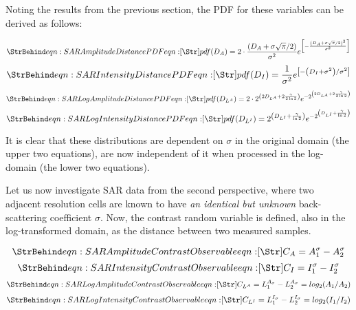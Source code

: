 Noting the results from the previous section, the PDF for these variables can be derived as follows:

\begin{equation}
  \label{eqn:SAR Amplitude Distance PDF}
  \caption{eqn:SAR Amplitude Distance PDF}
pdf(D_A) = 2 \cdot \frac{\left( D_A + \sigma \sqrt{\pi}/2 \right)}{\sigma^2}e^{ \left[ - \frac{\left( D_A + \sigma \sqrt{\pi}/2 \right)^2}{\sigma^2}   \right] }
\end{equation}
\begin{equation}
  \label{eqn:SAR Intensity Distance PDF}
  \caption{eqn:SAR Intensity Distance PDF}
pdf(D_I) = \frac{1}{\sigma^2}e^{\left[ -\left( D_I + \sigma^2 \right) / \sigma^2 \right] } \\
\end{equation}
\begin{equation}
  \label{eqn:SAR Log Amplitude Distance PDF}
  \caption{eqn:SAR Log Amplitude Distance PDF}
pdf(D_{L^A}) = 2 \cdot 2^{\left( 2 D_{L^A} + 2 \frac{\gamma}{2 \ln2} \right)} e^{-2^{\left( 2 D_{L^A} + 2 \frac{\gamma}{2 \ln2} \right)}}
\end{equation}
\begin{equation}
  \label{eqn:SAR Log Intensity Distance PDF}
  \caption{eqn:SAR Log Intensity Distance PDF}
pdf(D_{L^I}) = 2^{\left( D_{L^I} + \frac{\gamma}{\ln2} \right)} e^{-2^{\left( D_{L^I} + \frac{\gamma}{\ln2} \right)}}
\end{equation}

It is clear that these distributions are dependent on $\sigma$ in the original domain (the upper two equations), are now independent of it when processed in the log-domain (the lower two equations).

Let us now investigate SAR data from the second perspective,
  where two adjacent resolution cells are known to have \textit{an identical but unknown} back-scattering coefficient $\sigma$.
Now, the contrast random variable is defined, also in the log-transformed domain, as the distance between two measured samples.

\begin{equation}
  \label{eqn:SAR Amplitude Contrast Observable}
  \caption{eqn:SAR Amplitude Contrast Observable}
C_A = A_1^\sigma - A_2^\sigma 
\end{equation}
\begin{equation}
  \label{eqn:SAR Intensity Contrast Observable}
  \caption{eqn:SAR Intensity Contrast Observable}
C_I = I_1^\sigma - I_2^\sigma 
\end{equation}
\begin{equation}
  \label{eqn:SAR Log Amplitude Contrast Observable}
  \caption{eqn:SAR Log Amplitude Contrast Observable}
C_{L^A} = L_1^{A_\sigma} - L_2^{A_\sigma} = log_2 { \left( {A_1}/{A_2} \right) }
\end{equation}
\begin{equation}
  \label{eqn:SAR Log Intensity Contrast Observable}
  \caption{eqn:SAR Log Intensity Contrast Observable}
C_{L^I} = L_1^{I_\sigma} - L_2^{I_\sigma} = log_2 { \left( {I_1}/{I_2} \right) }
\end{equation}

